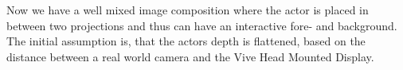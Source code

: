 



Now we have a well mixed image composition where the actor is placed in between 
two projections and thus can have an interactive fore- and background. The 
initial assumption is, that the actors depth is flattened, based on the 
distance between a real world camera and the Vive Head Mounted Display.
